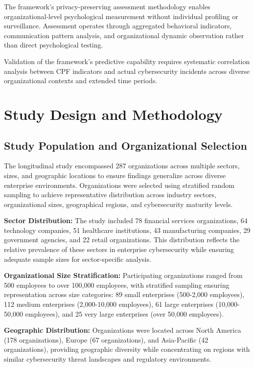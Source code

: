 \documentclass[10pt, twocolumn]{article}
\begin{document}
The framework's privacy-preserving assessment methodology enables organizational-level psychological measurement without individual profiling or surveillance. Assessment operates through aggregated behavioral indicators, communication pattern analysis, and organizational dynamic observation rather than direct psychological testing.

Validation of the framework's predictive capability requires systematic correlation analysis between CPF indicators and actual cybersecurity incidents across diverse organizational contexts and extended time periods.

\section{Study Design and Methodology}

\subsection{Study Population and Organizational Selection}

The longitudinal study encompassed 287 organizations across multiple sectors, sizes, and geographic locations to ensure findings generalize across diverse enterprise environments. Organizations were selected using stratified random sampling to achieve representative distribution across industry sectors, organizational sizes, geographical regions, and cybersecurity maturity levels.

\textbf{Sector Distribution:} The study included 78 financial services organizations, 64 technology companies, 51 healthcare institutions, 43 manufacturing companies, 29 government agencies, and 22 retail organizations. This distribution reflects the relative prevalence of these sectors in enterprise cybersecurity while ensuring adequate sample sizes for sector-specific analysis.

\textbf{Organizational Size Stratification:} Participating organizations ranged from 500 employees to over 100,000 employees, with stratified sampling ensuring representation across size categories: 89 small enterprises (500-2,000 employees), 112 medium enterprises (2,000-10,000 employees), 61 large enterprises (10,000-50,000 employees), and 25 very large enterprises (over 50,000 employees).

\textbf{Geographic Distribution:} Organizations were located across North America (178 organizations), Europe (67 organizations), and Asia-Pacific (42 organizations), providing geographic diversity while concentrating on regions with similar cybersecurity threat landscapes and regulatory environments.
\end{document}
